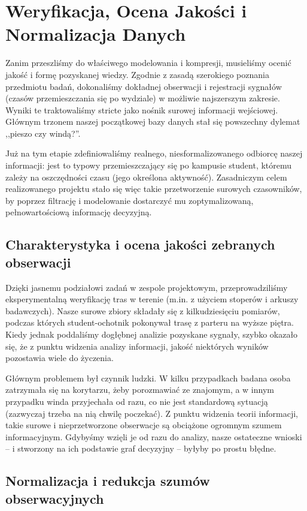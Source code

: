 \documentclass[12pt,a4paper]{article}
\begin{document}
\section{Weryfikacja, Ocena Jakości i Normalizacja Danych}

Zanim przeszliśmy do właściwego modelowania i kompresji, musieliśmy ocenić jakość i formę pozyskanej wiedzy. Zgodnie z zasadą szerokiego poznania przedmiotu badań, dokonaliśmy dokładnej obserwacji i rejestracji sygnałów (czasów przemieszczania się po wydziale) w możliwie najszerszym zakresie. Wyniki te traktowaliśmy stricte jako nośnik surowej informacji wejściowej. Głównym trzonem naszej początkowej bazy danych stał się powszechny dylemat ,,pieszo czy windą?''. 

Już na tym etapie zdefiniowaliśmy realnego, niesformalizowanego odbiorcę naszej informacji: jest to typowy przemieszczający się po kampusie student, któremu zależy na oszczędności czasu (jego określona aktywność). Zasadniczym celem realizowanego projektu stało się więc takie przetworzenie surowych czasowników, by poprzez filtrację i modelowanie dostarczyć mu zoptymalizowaną, pełnowartościową informację decyzyjną.

\subsection{Charakterystyka i ocena jakości zebranych obserwacji}

Dzięki jasnemu podziałowi zadań w zespole projektowym, przeprowadziliśmy eksperymentalną weryfikację tras w terenie (m.in. z użyciem stoperów i arkuszy badawczych). Nasze surowe zbiory składały się z kilkudziesięciu pomiarów, podczas których student-ochotnik pokonywał trasę z parteru na wyższe piętra. Kiedy jednak poddaliśmy dogłębnej analizie pozyskane sygnały, szybko okazało się, że z punktu widzenia analizy informacji, jakość niektórych wyników pozostawia wiele do życzenia.

Głównym problemem był czynnik ludzki. W kilku przypadkach badana osoba zatrzymała się na korytarzu, żeby porozmawiać ze znajomym, a w innym przypadku winda przyjechała od razu, co nie jest standardową sytuacją (zazwyczaj trzeba na nią chwilę poczekać). Z punktu widzenia teorii informacji, takie surowe i nieprzetworzone obserwacje są obciążone ogromnym szumem informacyjnym. Gdybyśmy wzięli je od razu do analizy, nasze ostateczne wnioski -- i stworzony na ich podstawie graf decyzyjny -- byłyby po prostu błędne.

\subsection{Normalizacja i redukcja szumów obserwacyjnych}
\end{document}

